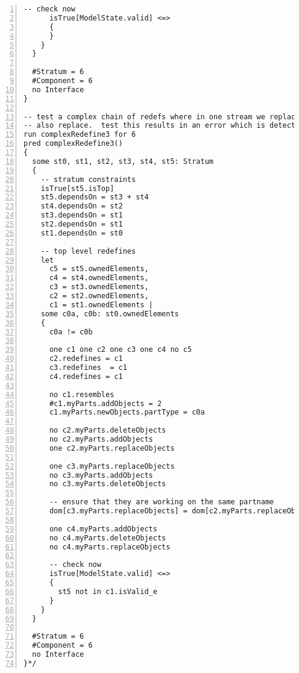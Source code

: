 \begin{lstlisting}[caption={unittests\_redefinition.als}, numbers=left]
      -- check now
      isTrue[ModelState.valid] <=>
      {
      }
    }
  }

  #Stratum = 6
  #Component = 6
  no Interface
}

-- test a complex chain of redefs where in one stream we replace and in the other we
-- also replace.  test this results in an error which is detected
run complexRedefine3 for 6
pred complexRedefine3()
{
  some st0, st1, st2, st3, st4, st5: Stratum
  {
    -- stratum constraints
    isTrue[st5.isTop]
    st5.dependsOn = st3 + st4
    st4.dependsOn = st2
    st3.dependsOn = st1
    st2.dependsOn = st1
    st1.dependsOn = st0

    -- top level redefines
    let
      c5 = st5.ownedElements,
      c4 = st4.ownedElements,
      c3 = st3.ownedElements,
      c2 = st2.ownedElements,
      c1 = st1.ownedElements |
    some c0a, c0b: st0.ownedElements
    {
      c0a != c0b
      
      one c1 one c2 one c3 one c4 no c5
      c2.redefines = c1
      c3.redefines  = c1
      c4.redefines = c1
  
      no c1.resembles
      #c1.myParts.addObjects = 2
      c1.myParts.newObjects.partType = c0a
      
      no c2.myParts.deleteObjects
      no c2.myParts.addObjects
      one c2.myParts.replaceObjects
      
      one c3.myParts.replaceObjects
      no c3.myParts.addObjects
      no c3.myParts.deleteObjects
      
      -- ensure that they are working on the same partname
      dom[c3.myParts.replaceObjects] = dom[c2.myParts.replaceObjects]
      
      one c4.myParts.addObjects
      no c4.myParts.deleteObjects
      no c4.myParts.replaceObjects
      
      -- check now
      isTrue[ModelState.valid] <=>
      {
        st5 not in c1.isValid_e
      }
    }
  }

  #Stratum = 6
  #Component = 6
  no Interface
}*/
\end{lstlisting}